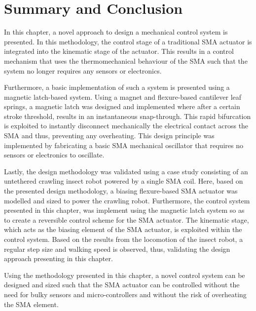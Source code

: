 \section{Summary and Conclusion}
In this chapter, a novel approach to design a mechanical control system is presented. In this methodology, the control stage of a traditional SMA actuator is integrated into the kinematic stage of the actuator. This results in a control mechanism that uses the thermomechanical behaviour of the SMA such that the system no longer requires any sensors or electronics.

Furthermore, a basic implementation of such a system is presented using a magnetic latch-based system. Using a magnet and flexure-based cantilever leaf springs, a magnetic latch was designed and implemented where after a certain stroke threshold, results in an instantaneous snap-through. This rapid bifurcation is exploited to instantly disconnect mechanically the electrical contact across the SMA and thus, preventing any overheating. This design principle was implemented by fabricating a basic SMA mechanical oscillator that requires no sensors or electronics to oscillate.

Lastly, the design methodology was validated using a case study consisting of an untethered crawling insect robot powered by a single SMA coil. Here, based on the presented design methodology, a biasing flexure-based SMA actuator was modelled and sized to power the crawling robot. Furthermore, the control system presented in this chapter, was implement using the magnetic latch system so as to create a reversible control scheme for the SMA actuator. The kinematic stage, which acts as the biasing element of the SMA actuator, is exploited within the control system. Based on the results from the locomotion of the insect robot, a regular step size and walking speed is observed, thus, validating the design approach presenting in this chapter.

Using the methodology presented in this chapter, a novel control system can be designed and sized such that the SMA actuator can be controlled without the need for bulky sensors and micro-controllers and without the risk of overheating the SMA element.
